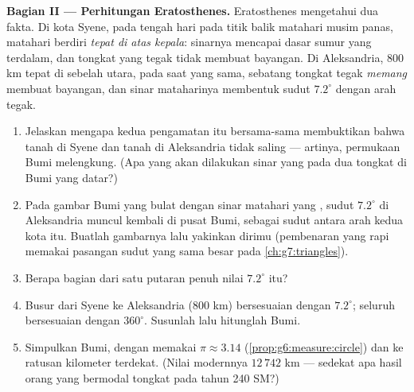 \begin{problem}
\medskip
\noindent\textbf{Bagian II --- Perhitungan Eratosthenes.}
Eratosthenes mengetahui dua fakta. Di kota Syene, pada tengah hari
pada titik balik matahari musim panas, matahari berdiri \emph{tepat
di atas kepala}: sinarnya mencapai dasar sumur yang terdalam, dan
tongkat yang tegak tidak membuat bayangan. Di Aleksandria, $800$ km
tepat di sebelah utara, pada saat yang sama, sebatang tongkat tegak
\emph{memang} membuat bayangan, dan sinar mataharinya membentuk sudut
$7.2^\circ$ dengan arah tegak.
\begin{enumerate}[resume]
  \item Jelaskan mengapa kedua pengamatan itu bersama-sama
        membuktikan bahwa tanah di Syene dan tanah di Aleksandria
        tidak saling  --- artinya, permukaan Bumi melengkung.
        (Apa yang akan dilakukan sinar yang  pada dua tongkat
        di Bumi yang datar?)
  \item Pada gambar Bumi yang bulat dengan sinar matahari yang
        , sudut $7.2^\circ$ di Aleksandria muncul kembali di
        pusat Bumi, sebagai sudut antara arah kedua kota itu. Buatlah
        gambarnya lalu yakinkan dirimu (pembenaran yang rapi memakai
        pasangan sudut yang sama besar pada
        \cref{ch:g7:triangles}).
  \item Berapa bagian dari satu putaran penuh nilai $7.2^\circ$ itu?
  \item Busur dari Syene ke Aleksandria ($800$ km) bersesuaian dengan
        $7.2^\circ$; seluruh  bersesuaian dengan
        $360^\circ$. Susunlah  lalu hitunglah
         Bumi.
  \item Simpulkan  Bumi, dengan memakai $\pi \approx
        3.14$ (\cref{prop:g6:measure:circle}) dan  ke
        ratusan kilometer terdekat. (Nilai modernnya
        $12\,742$ km --- sedekat apa hasil orang yang bermodal
        tongkat pada tahun 240 SM?)
\end{enumerate}


\end{problem}
